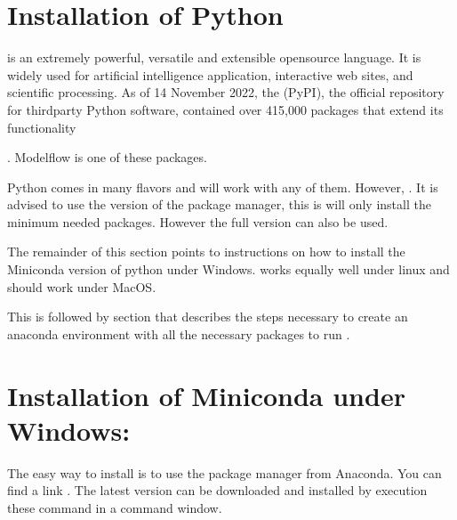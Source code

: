 \documentclass[letterpaper,10pt,english]{jupyterBook}
\begin{document}
\section{Installation of Python}
\label{\detokenize{content/03_Installation/Installing:installation-of-python}}
\sphinxAtStartPar
{} is an extremely powerful, versatile and extensible open\sphinxhyphen{}source language. It is widely used for artificial intelligence application, interactive web sites, and scientific processing. As of 14 November 2022, the  (PyPI), the official repository for third\sphinxhyphen{}party Python software, contained over 415,000 packages that extend its functionality %
\begin{footnote}[1]\sphinxAtStartFootnote
{}
%
\end{footnote}. Modelflow is one of these packages.

\sphinxAtStartPar
Python comes in many flavors and  will work with any of them.  However, . It is advised to use the  version of the package manager, this is will only install the minimum needed packages. However the full  version can also be used.

\sphinxAtStartPar
The remainder of this section points to instructions on how to install the Miniconda version of python under Windows.  works equally well under linux and should work under MacOS.

\sphinxAtStartPar
This is followed by section that describes the steps necessary to create an anaconda environment with all the necessary packages to run .


\section{Installation of Miniconda under Windows:}
\label{\detokenize{content/03_Installation/Installing:installation-of-miniconda-under-windows}}
\sphinxAtStartPar
The easy way to install is to use the  package manager from Anaconda. You can find a link . The latest version can be downloaded and installed by execution these command in a command window.
\end{document}
